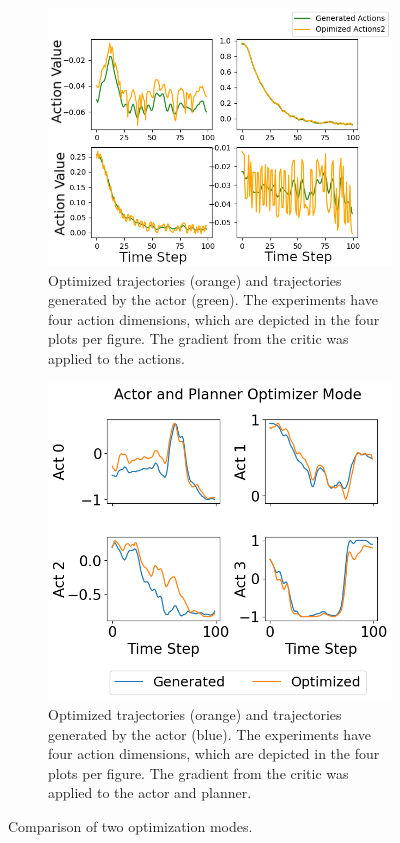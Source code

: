 \begin{figure}[htbp]
    \begin{subfigure}{0.48\textwidth}
      \includegraphics[width=\textwidth]{images/Plan_vs_Actions/changes_axis/actions_1_axis.png}
      \caption{Optimized trajectories (orange) and trajectories generated by the actor (green). 
      The experiments have four action dimensions, which are depicted in the 
      four plots per figure. 
      The gradient from the critic was applied to the actions.}
      \label{fig:direct_actions}
    \end{subfigure}
    \begin{subfigure}{0.48\textwidth}
      \includegraphics[width=\textwidth]{images/Plan_vs_Actions/vector_changes/Actor and Planner Optimizer Mode.png}
      \caption{Optimized trajectories (orange) and trajectories generated by the actor (blue). 
      The experiments have four action dimensions, which are depicted in the 
      four plots per figure. The gradient from the critic was applied to the actor and planner.}
      \label{fig:ac_pl_actions}
    \end{subfigure}
    \caption{Comparison of two optimization modes.}
    \label{fig:action_vs_actor}
\end{figure}

